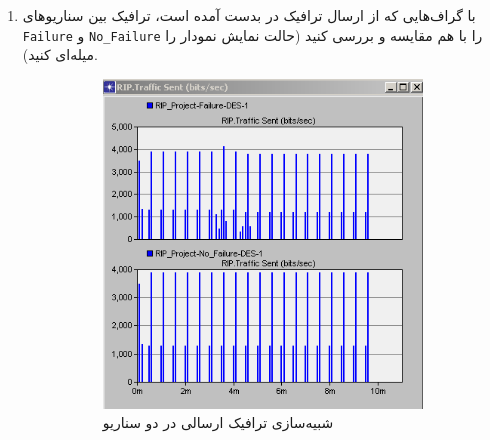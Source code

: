 \documentclass[a4paper]{article}
\begin{document}
\begin{enumerate}
    \item با گراف‌هایی که از ارسال ترافیک در  بدست آمده است، ترافیک بین
    سناریو‌های \texttt{Failure} و \texttt{No\_Failure} را با هم مقایسه و بررسی
    کنید (حالت نمایش نمودار را میله‌ای کنید).

    \begin{figure}[h!]
        \centering
        \begin{subfigure}{0.45\textwidth}
            \centering
            \includegraphics[width=\textwidth]{./figs/traffic_sent.png}
            \caption{شبیه‌سازی ترافیک ارسالی در دو سناریو}
        \end{subfigure}
        \hfill
        \begin{subfigure}{0.45\textwidth}
            \centering

\end{subfigure}
\end{figure}
\end{enumerate}
\end{document}
